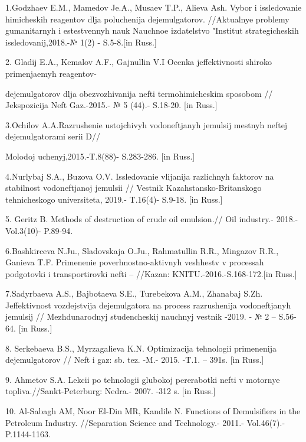 \begin{noparindent}
1.Godzhaev E.M., Mamedov Je.A., Musaev T.P., Alieva Ash. Vybor i
issledovanie himicheskih reagentov dlja poluchenija
dejemul\textquotesingle gatorov. //Aktual\textquotesingle nye problemy
gumanitarnyh i estestvennyh nauk Nauchnoe izdatel\textquotesingle stvo
"Institut strategicheskih issledovanij,2018.-№ 1(2) - S.5-8.{[}in
Russ.{]}

2. Gladij E.A., Kemalov A.F., Gajnullin V.I Ocenka jeffektivnosti
shiroko primenjaemyh reagentov-

dejemul\textquotesingle gatorov dlja
obezvozhivanija nefti termohimicheskim sposobom // Jekspozicija
Neft\textquotesingle{} Gaz.-2015.- № 5 (44).- S.18-20. {[}in Russ.{]}

3.Ochilov A.A.Razrushenie ustojchivyh vodoneftjanyh
jemul\textquotesingle sij mestnyh neftej
dejemul\textquotesingle gatorami serii D//

Molodoj
uchenyj,2015.-T.8(88)- S.283-286. {[}in Russ.{]}

4.Nurlybaj S.A., Buzova O.V. Issledovanie vlijanija razlichnyh faktorov
na stabil\textquotesingle nost\textquotesingle{} vodoneftjanoj
jemul\textquotesingle sii // Vestnik Kazahstansko-Britanskogo
tehnicheskogo universiteta, 2019.- T.16(4)- S.9-18. {[}in Russ.{]}

5. Geritz B. Methods of destruction of crude oil emulsion.// Oil
industry.- 2018.- Vol.3(10)- P.89-94.

6.Bashkirceva N.Ju., Sladovskaja O.Ju., Rahmatullin R.R., Mingazov R.R.,
Ganieva T.F. Primenenie poverhnostno-aktivnyh veshhestv v processah
podgotovki i transportirovki nefti -- //Kazan\textquotesingle:
KNITU.-2016.-S.168-172.{[}in Russ.{]}

7.Sadyrbaeva A.S., Bajbotaeva S.E., Turebekova A.M., Zhanabaj S.Zh.
Jeffektivnost\textquotesingle{} vozdejstvija
dejemul\textquotesingle gatora na process razrushenija vodoneftjanyh
jemul\textquotesingle sij // Mezhdunarodnyj studencheskij nauchnyj
vestnik -2019. - № 2 -- S.56-64. {[}in Russ.{]}

8. Serkebaeva B.S., Myrzagalieva K.N. Optimizacija tehnologii
primenenija dejemul\textquotesingle gatorov // Neft\textquotesingle{} i
gaz: sb. tez. -M.- 2015. -T.1. -- 391s. {[}in Russ.{]}

9. Ahmetov S.A. Lekcii po tehnologii glubokoj pererabotki nefti v
motornye topliva.//Sankt-Peterburg: Nedra.- 2007. -312 s. {[}in Russ.{]}

10. Al-Sabagh AM, Noor El-Din MR, Kandile N. Functions of Demulsifiers
in the Petroleum Industry. //Separation Science and Technology.- 2011.-
Vol.46(7).- P.1144-1163.


\end{noparindent}
